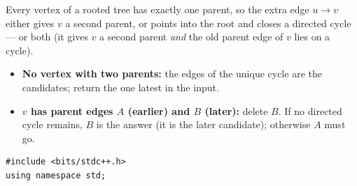 \begin{solutionbox}
Every vertex of a rooted tree has exactly one parent, so the extra edge $u \to v$ either gives $v$ a second parent, or points into the root and closes a directed cycle --- or both (it gives $v$ a second parent \emph{and} the old parent edge of $v$ lies on a cycle).
\begin{itemize}[leftmargin=*]
    \item \textbf{No vertex with two parents:} the edges of the unique cycle are the candidates; return the one latest in the input.
    \item \textbf{$v$ has parent edges $A$ (earlier) and $B$ (later):} delete $B$. If no directed cycle remains, $B$ is the answer (it is the later candidate); otherwise $A$ must go.
\end{itemize}
\begin{lstlisting}[style=cpp]
#include <bits/stdc++.h>
using namespace std;


\end{lstlisting}
\end{solutionbox}
